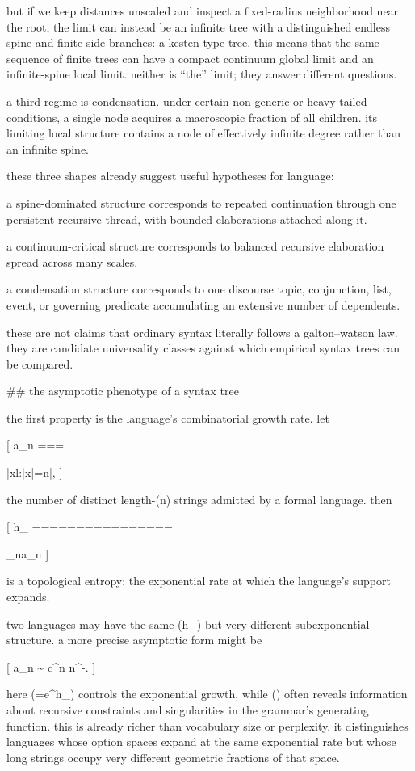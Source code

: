 but if we keep distances unscaled and inspect a fixed-radius neighborhood near the root, the limit can instead be an infinite tree with a distinguished endless spine and finite side branches: a kesten-type tree. this means that the same sequence of finite trees can have a compact continuum global limit and an infinite-spine local limit. neither is “the” limit; they answer different questions.

a third regime is condensation. under certain non-generic or heavy-tailed conditions, a single node acquires a macroscopic fraction of all children. its limiting local structure contains a node of effectively infinite degree rather than an infinite spine.

these three shapes already suggest useful hypotheses for language:

a spine-dominated structure corresponds to repeated continuation through one persistent recursive thread, with bounded elaborations attached along it.

a continuum-critical structure corresponds to balanced recursive elaboration spread across many scales.

a condensation structure corresponds to one discourse topic, conjunction, list, event, or governing predicate accumulating an extensive number of dependents.

these are not claims that ordinary syntax literally follows a galton–watson law. they are candidate universality classes against which empirical syntax trees can be compared.

## the asymptotic phenotype of a syntax tree

the first property is the language’s combinatorial growth rate. let

[
a_n
===

|{x\in l:|x|=n}|,
]

the number of distinct length-(n) strings admitted by a formal language. then

[
h_{}
================

\limsup_{n\to\infty}\log a_n
]

is a topological entropy: the exponential rate at which the language’s support expands.

two languages may have the same (h_{}) but very different subexponential structure. a more precise asymptotic form might be

[
a_n
\sim
c\mu^n n^{-\alpha}.
]

here (\mu=e^{h_{}}) controls the exponential growth, while (\alpha) often reveals information about recursive constraints and singularities in the grammar’s generating function. this is already richer than vocabulary size or perplexity. it distinguishes languages whose option spaces expand at the same exponential rate but whose long strings occupy very different geometric fractions of that space.

